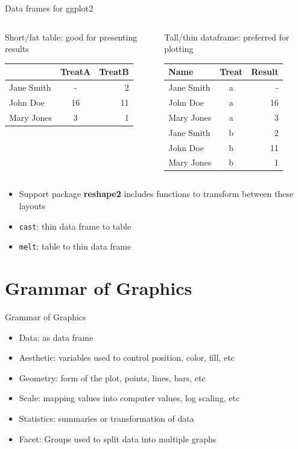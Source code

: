 \documentclass[aspectratio=169]{beamer}\usepackage[]{graphicx}\usepackage[]{color}
\newcommand\Fontvi{\fontsize{9}{7.5}\selectfont}
\begin{document}
\begin{frame}[fragile]{Data frames for ggplot2}
\Fontvi
\begin{columns}
  \begin{column}{0.50\textwidth}
Short/fat table: good for presenting results
\begin{tabular}{ l | c r }
  \hline
   & TreatA & TreatB \\
  \hline 
  Jane Smith & - & 2 \\
  John Doe & 16 & 11 \\
  Mary Jones & 3 & 1 \\
  \hline
\end{tabular}
\end{column}
  \begin{column}{0.5\textwidth}
Tall/thin dataframe: preferred for plotting
\begin{tabular}{ l | c | r }
  \hline 
  Name & Treat & Result \\
  \hline 
  Jane Smith & a & - \\
  John Doe & a & 16 \\
  Mary Jones & a & 3 \\
  Jane Smith & b & 2 \\
  John Doe & b & 11 \\
  Mary Jones & b & 1 \\
  \hline 
\end{tabular}

\end{column}
\end{columns}
\begin{itemize}
  \item Support package \textbf{reshape2} includes functions to transform between these layouts
  \item \texttt{cast}: thin data frame to table
  \item \texttt{melt}: table to thin data frame 
\end{itemize}
\end{frame}

\section{Grammar of Graphics}
\begin{frame}{Grammar of Graphics}
  \begin{itemize}
    \item Data: as data frame
    \item Aesthetic: variables used to control position, color, fill, etc
    \item Geometry: form of the plot, points, lines, bars, etc
    \item Scale: mapping values into computer values, log scaling, etc
    \item Statistics: summaries or transformation of data
    \item Facet: Groups used to split data into multiple graphs
  \end{itemize}
\end{frame}
\end{document}
